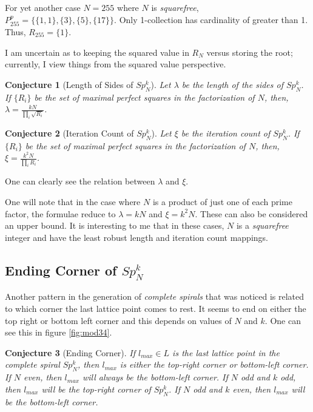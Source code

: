 \documentclass[11pt]{amsart}
\theoremstyle{mydef}
\newtheorem{conj}{Conjecture}[section]
\begin{document}
For yet another case $N=255$ where $N$ is \textit{squarefree}, $P^p_{255} = \{ \{1,1\}, \{ 3 \}, \{ 5\}, \{17\} \}$. Only 1-collection has cardinality of greater than 1. Thus, $R_{255} = \{ 1 \}$.

I am uncertain as to keeping the squared value in $R_N$ versus  storing the root; currently, I view things from the squared value perspective.


\begin{conj}[Length of Sides of $Sp^k_N$]
Let $\lambda$ be the length of the sides of $Sp^k_N$. If $\{R_i\}$ be the set of maximal perfect squares in the factorization of $N$, then, $\lambda = \frac{kN}{\prod\limits_i \sqrt{R_i}}$.
\end{conj}

\begin{conj}[Iteration Count of $Sp^k_N$]
Let $\xi$ be the iteration count  of $Sp^k_N$. If $\{R_i\}$ be the set of maximal perfect squares in the factorization of $N$, then, $\xi = \frac{k^2N}{\prod\limits_i R_i}$.
\end{conj}

One can clearly see the relation between $\lambda$ and $\xi$. 

One will note that in the case where $N$ is a product of just one of each prime factor, the formulae reduce to $\lambda = kN$ and $\xi = k^2N$. These can also be considered an upper bound. It is interesting to me that in these cases, $N$ is a \textit{squarefree} integer and have the least robust length and iteration count mappings.

\subsection{Ending Corner of $Sp^k_N$}

Another pattern in the generation of \textit{complete spirals} that was noticed is related to which corner the last lattice point comes to rest. It seems to end on either the top right or bottom left corner and this depends on values of $N$ and $k$. One can see this in figure \ref{fig:mod34}.

\begin{conj}[Ending Corner]
If $l_{max} \in L$ is the last lattice point in the complete spiral $Sp^k_N$, then $l_{max}$ is either the top-right corner or bottom-left corner. If $N$ even, then $l_{max}$ will always be the bottom-left corner. If $N$ odd and $k$ odd, then $l_{max}$ will be the top-right corner of $Sp^k_N$. If $N$ odd and $k$ even, then $l_{max}$ will be the bottom-left corner.
\end{conj}
\end{document}
